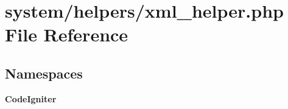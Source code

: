 \section{system/helpers/xml\-\_\-helper.php File Reference}
\label{xml__helper_8php}
\subsection*{Namespaces}
\begin{DoxyCompactItemize}
\item 
{\bf Code\-Igniter}
\end{DoxyCompactItemize}
